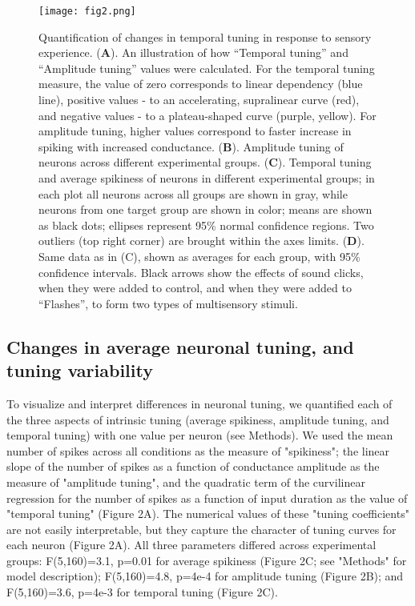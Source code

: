 \documentclass{article}
\begin{document}
\begin{figure*}[!t]
\texttt{[image: fig2.png]}
\caption{
Quantification of changes in temporal tuning in response to sensory experience. (\textbf{A}). An illustration of how “Temporal tuning” and “Amplitude tuning” values were calculated. For the temporal tuning measure, the value of zero corresponds to linear dependency (blue line), positive values - to an accelerating, supralinear curve (red), and negative values - to a plateau-shaped curve (purple, yellow). For amplitude tuning, higher values correspond to faster increase in spiking with increased conductance. (\textbf{B}). Amplitude tuning of neurons across different experimental groups. (\textbf{C}). Temporal tuning and average spikiness of neurons in different experimental groups; in each plot all neurons across all groups are shown in gray, while neurons from one target group are shown in color; means are shown as black dots; ellipses represent 95\% normal confidence regions. Two outliers (top right corner) are brought within the axes limits. (\textbf{D}). Same data as in (C), shown as averages for each group, with 95\% confidence intervals. Black arrows show the effects of sound clicks, when they were added to control, and when they were added to “Flashes”, to form two types of multisensory stimuli.}
\end{figure*}

\subsection*{Changes in average neuronal tuning, and tuning variability}

To visualize and interpret differences in neuronal tuning, we quantified each of the three aspects of intrinsic tuning (average spikiness, amplitude tuning, and temporal tuning) with one value per neuron (see Methods). We used the mean number of spikes across all conditions as the measure of "spikiness"; the linear slope of the number of spikes as a function of conductance amplitude as the measure of "amplitude tuning", and the quadratic term of the curvilinear regression for the number of spikes as a function of input duration as the value of "temporal tuning" (Figure 2A). The numerical values of these "tuning coefficients" are not easily interpretable, but they capture the character of tuning curves for each neuron (Figure 2A). All three parameters differed across experimental groups: F(5,160)=3.1, p=0.01 for average spikiness (Figure 2C; see "Methods" for model description); F(5,160)=4.8, p=4e-4 for amplitude tuning (Figure 2B); and F(5,160)=3.6, p=4e-3 for temporal tuning (Figure 2C).
\end{document}
